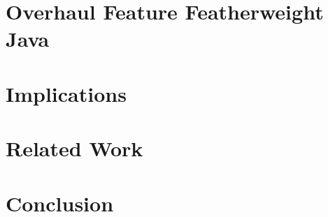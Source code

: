 \documentclass[runningheads,a4paper]{doc/llncs}
\begin{document}
\section{Overhaul Feature Featherweight Java}\label{seq:ffj}



\section{Implications}\label{seq:impl}

\section{Related Work}\label{seq:related}

\section{Conclusion}\label{seq:conclusion}


{}





\end{document}
